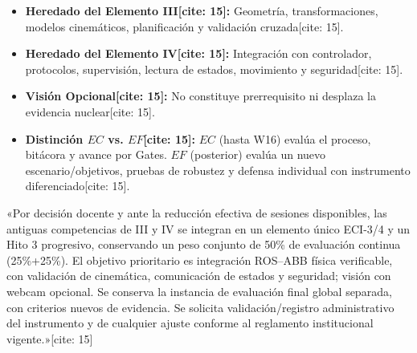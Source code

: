\documentclass[11pt, a4paper, landscape]{article}
\begin{document}
\vspace{0.4cm}
\noindent
\begin{minipage}[t]{0.48\textwidth}
    \begin{tcolorbox}[colback=white, colframe=ucbblue, title=\textbf{Trazabilidad y Separación $EC$ vs. $EF$} {[cite: 15]}, left=2mm, right=2mm, top=1mm, bottom=1mm]
        \scriptsize
        \begin{itemize}
            \item \textbf{Heredado del Elemento III[cite: 15]:} Geometría, transformaciones, modelos cinemáticos, planificación y validación cruzada[cite: 15].
            \item \textbf{Heredado del Elemento IV[cite: 15]:} Integración con controlador, protocolos, supervisión, lectura de estados, movimiento y seguridad[cite: 15].
            \item \textbf{Visión Opcional[cite: 15]:} No constituye prerrequisito ni desplaza la evidencia nuclear[cite: 15].
            \item \textbf{Distinción $EC$ vs. $EF$[cite: 15]:} $EC$ (hasta W16) evalúa el proceso, bitácora y avance por Gates. $EF$ (posterior) evalúa un nuevo escenario/objetivos, pruebas de robustez y defensa individual con instrumento diferenciado[cite: 15].
        \end{itemize}
    \end{tcolorbox}
\end{minipage}%
\hfill
\begin{minipage}[t]{0.48\textwidth}
    \begin{tcolorbox}[colback=yellow!10, colframe=black, title=\textbf{Nota Oficial de Reprogramación para Registro Académico} {[cite: 15]}, left=2mm, right=2mm, top=1mm, bottom=1mm]
        \scriptsize
        «Por decisión docente y ante la reducción efectiva de sesiones disponibles, las antiguas competencias de III y IV se integran en un elemento único ECI-3/4 y un Hito 3 progresivo, conservando un peso conjunto de 50\% de evaluación continua (25\%+25\%). El objetivo prioritario es integración ROS–ABB física verificable, con validación de cinemática, comunicación de estados y seguridad; visión con webcam opcional. Se conserva la instancia de evaluación final global separada, con criterios nuevos de evidencia. Se solicita validación/registro administrativo del instrumento y de cualquier ajuste conforme al reglamento institucional vigente.»[cite: 15]
    \end{tcolorbox}
\end{minipage}
\end{document}
